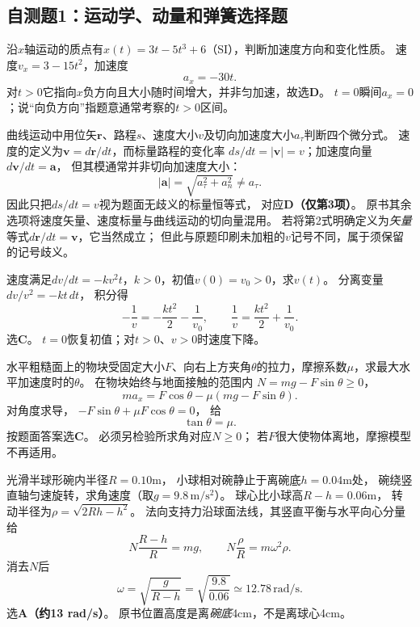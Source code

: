 \subsection{自测题1：运动学、动量和弹簧选择题}

\problemtext 沿$x$轴运动的质点有$x(t)=3t-5t^3+6$（SI），判断加速度方向和变化性质。
\workings
速度$v_x=3-15t^2$，加速度
\[
\boxed{a_x=-30t}.
\]
对$t>0$它指向$x$负方向且大小随时间增大，并非匀加速，故选\textbf{D}。
\crosscheck $t=0$瞬间$a_x=0$；说“向负方向”指题意通常考察的$t>0$区间。

\problemtext 曲线运动中用位矢$\bm r$、路程$s$、速度大小$v$及切向加速度大小$a_\tau$判断四个微分式。
\workings
速度的定义为$\bm v=d\bm r/dt$，而标量路程的变化率
$ds/dt=|\bm v|=v$；加速度向量$d\bm v/dt=\bm a$，
但其模通常并非切向加速度大小：
\[
|\bm a|=\sqrt{a_\tau^2+a_n^2}\ne a_\tau.
\]
因此只把$ds/dt=v$视为题面无歧义的标量恒等式，
对应\textbf{D（仅第3项）}。
\crosscheck 原书其余选项将速度矢量、速度标量与曲线运动的切向量混用。
若将第2式明确定义为\emph{矢量}等式$d\bm r/dt=\bm v$，它当然成立；
但此与原题印刷未加粗的$v$记号不同，属于须保留的记号歧义。

\problemtext 速度满足$dv/dt=-kv^2t$，$k>0$，初值$v(0)=v_0>0$，求$v(t)$。
\workings
分离变量
$dv/v^2=-kt\,dt$，
积分得
\[
-\frac1v=-\frac{kt^2}{2}-\frac1{v_0},
\qquad
\boxed{\frac1v=\frac{kt^2}{2}+\frac1{v_0}}.
\]
选\textbf{C}。
\crosscheck $t=0$恢复初值；对$t>0$、$v>0$时速度下降。

\problemtext 水平粗糙面上的物块受固定大小$F$、向右上方夹角$\theta$的拉力，摩擦系数$\mu$，求最大水平加速度时的$\theta$。
\workings
在物块始终与地面接触的范围内
$N=mg-F\sin\theta\ge0$，
\[
ma_x=F\cos\theta-\mu(mg-F\sin\theta).
\]
对角度求导，
$-F\sin\theta+\mu F\cos\theta=0$，
给
\[
\boxed{\tan\theta=\mu}.
\]
按题面答案选\textbf{C}。
\crosscheck 必须另检验所求角对应$N\ge0$；
若$F$很大使物体离地，摩擦模型不再适用。

\problemtext 光滑半球形碗内半径$R=0.10$m，
小球相对碗静止于离碗底$h=0.04$m处，
碗绕竖直轴匀速旋转，求角速度（取$g=9.8\,\mathrm{m/s^2}$）。
\workings
球心比小球高$R-h=0.06$m，
转动半径为$\rho=\sqrt{2Rh-h^2}$。
法向支持力沿球面法线，其竖直平衡与水平向心分量给
\[
N\frac{R-h}{R}=mg,\qquad
N\frac{\rho}{R}=m\omega^2\rho.
\]
消去$N$后
\[
\boxed{\omega=\sqrt{\frac g{R-h}}
=\sqrt{\frac{9.8}{0.06}}
\simeq12.78\,\mathrm{rad/s}}.
\]
选\textbf{A（约13 rad/s）}。
\crosscheck 原书位置高度是离\emph{碗底}4cm，不是离球心4cm。

